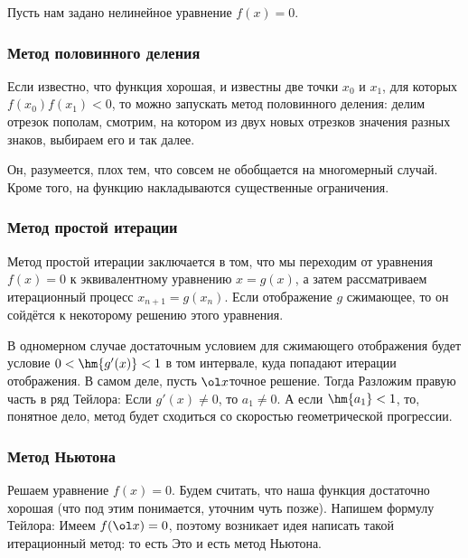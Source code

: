 \documentclass[a4paper]{article}
\begin{document}
Пусть нам задано нелинейное уравнение $f(x) = 0$.

\subsubsection{Метод половинного деления}

Если известно, что функция хорошая,
и известны две точки $x_0$ и $x_1$, для которых $f(x_0) f(x_1) < 0$, то можно запускать метод
половинного деления: делим отрезок пополам, смотрим, на котором из двух новых отрезков
значения разных знаков, выбираем его и так далее.

Он, разумеется, плох тем, что совсем не обобщается на многомерный случай.
Кроме того, на функцию накладываются существенные ограничения.

\subsubsection{Метод простой итерации}

Метод простой итерации заключается в том, что мы переходим от уравнения $f(x) = 0$
к эквивалентному уравнению $x = g(x)$, а затем рассматриваем итерационный процесс $x_{n+1} = g(x_n)$.
Если отображение $g$ сжимающее, то он сойдётся к некоторому решению этого уравнения.

В одномерном случае достаточным условием для сжимающего отображения
будет условие $0 < \hm{g'(x)} < 1$ в том интервале, куда попадают итерации отображения.
В самом деле, пусть $\ol x$\т точное решение. Тогда
Разложим правую часть в ряд Тейлора:
Если $g'(x) \ne 0$, то $a_1 \ne 0$. А если $\hm{a_1} < 1$,
то, понятное дело, метод будет сходиться со скоростью геометрической прогрессии.

\subsubsection{Метод Ньютона}

Решаем уравнение $f(x) = 0$.
Будем считать, что наша функция достаточно хорошая (что под этим понимается, уточним чуть позже).
Напишем формулу Тейлора:
Имеем $f(\ol x) = 0$, поэтому возникает идея написать такой итерационный метод:
то есть
Это и есть метод Ньютона.
\end{document}
